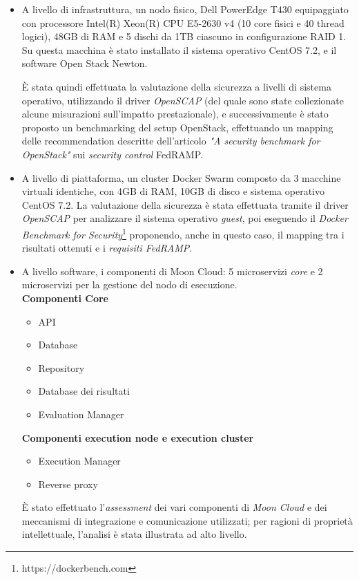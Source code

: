 \documentclass[../main.tex]{subfiles}
\begin{document}
\begin{itemize}
    \item A livello di infrastruttura, un nodo fisico, Dell PowerEdge T430 equipaggiato con processore Intel(R) Xeon(R) CPU E5-2630 v4 (10 core fisici e 40 thread logici), 48GB di RAM e 5 dischi da 1TB ciascuno in configurazione RAID 1. Su questa macchina è stato installato il sistema operativo CentOS 7.2, e il software Open Stack Newton.

        È stata quindi effettuata la valutazione della sicurezza a livelli di sistema operativo, utilizzando il driver \textit{OpenSCAP} (del quale sono state collezionate alcune misurazioni sull'impatto prestazionale), e successivamente è stato proposto un benchmarking del setup OpenStack, effettuando un mapping delle recommendation descritte dell'articolo \textit{"A security benchmark for OpenStack"}\cite{MyPaper} sui \textit{security control} FedRAMP. 
    \item A livello di piattaforma, un cluster Docker Swarm composto da 3 macchine virtuali identiche, con 4GB di RAM, 10GB di disco e sistema operativo CentOS 7.2.
        La valutazione della sicurezza è stata effettuata tramite il driver \textit{OpenSCAP} per analizzare il sistema operativo \textit{guest}, poi eseguendo il \textit{Docker Benchmark for Security}\footnote{https://dockerbench.com} proponendo, anche in questo caso, il mapping tra i risultati ottenuti e i \textit{requisiti FedRAMP}.

    \item A livello software, i componenti di Moon Cloud: 5 microservizi \textit{core} e 2 microservizi per la gestione del nodo di esecuzione.\\
        \textbf{Componenti Core}
        \begin{itemize}
            \item API
            \item Database
            \item Repository
            \item Database dei risultati
            \item Evaluation Manager
        \end{itemize}
        \textbf{Componenti execution node e execution cluster}
        \begin{itemize}
            \item Execution Manager
            \item Reverse proxy
        \end{itemize}

        È stato effettuato l'\textit{assessment} dei vari componenti di \textit{Moon Cloud} e dei meccanismi di integrazione e comunicazione utilizzati; per ragioni di proprietà intellettuale, l'analisi è stata illustrata ad alto livello.
\end{itemize}
\end{document}
